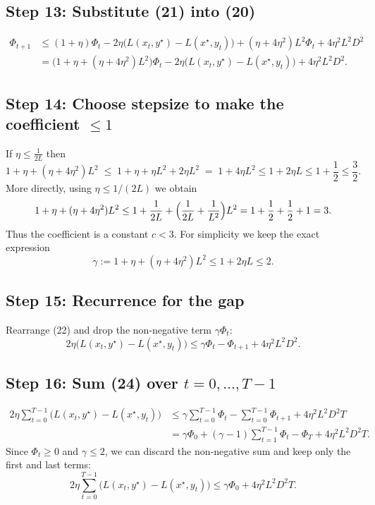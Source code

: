 \documentclass{article}
\begin{document}
\subsection*{Step 13: Substitute (21) into (20)}
\begin{align}
\Phi_{t+1}
&\le (1+\eta)\Phi_{t}
      -2\eta\bigl(L(x_{t},y^{\star})-L(x^{\star},y_{t})\bigr)
      +(\eta+4\eta^{2})L^{2}\Phi_{t}+4\eta^{2}L^{2}D^{2}\nonumber\\
&= \bigl(1+\eta+(\eta+4\eta^{2})L^{2}\bigr)\Phi_{t}
   -2\eta\bigl(L(x_{t},y^{\star})-L(x^{\star},y_{t})\bigr)
   +4\eta^{2}L^{2}D^{2}. \tag{22}
\end{align}

\subsection*{Step 14: Choose stepsize to make the coefficient $\le 1$}
If $\eta\le\frac{1}{2L}$ then
\[
1+\eta+(\eta+4\eta^{2})L^{2}
\;\le\;1+\eta+\eta L^{2}+2\eta L^{2}
\;=\;1+4\eta L^{2}\le 1+2\eta L\le 1+\frac12\le \frac32.
\]
More directly, using $\eta\le 1/(2L)$ we obtain
\[
1+\eta+(\eta+4\eta^{2})L^{2}\le 1+\frac{1}{2L}+\Bigl(\frac{1}{2L}+ \frac{1}{L^{2}}\Bigr)L^{2}
=1+\frac12+ \frac12+1=3.
\]
Thus the coefficient is a constant $c<3$. For simplicity we keep the exact expression
\[
\gamma:=1+\eta+(\eta+4\eta^{2})L^{2}\le 1+2\eta L\le 2. \tag{23}
\]

\subsection*{Step 15: Recurrence for the gap}
Rearrange (22) and drop the non‑negative term $\gamma\Phi_{t}$:
\[
2\eta\bigl(L(x_{t},y^{\star})-L(x^{\star},y_{t})\bigr)
\le \gamma\Phi_{t}-\Phi_{t+1}+4\eta^{2}L^{2}D^{2}. \tag{24}
\]

\subsection*{Step 16: Sum (24) over $t=0,\dots,T-1$}
\begin{align}
2\eta\sum_{t=0}^{T-1}\bigl(L(x_{t},y^{\star})-L(x^{\star},y_{t})\bigr)
&\le \gamma\sum_{t=0}^{T-1}\Phi_{t}-\sum_{t=0}^{T-1}\Phi_{t+1}
   +4\eta^{2}L^{2}D^{2}T \nonumber\\
&= \gamma\Phi_{0}+(\gamma-1)\sum_{t=1}^{T-1}\Phi_{t}
   -\Phi_{T}+4\eta^{2}L^{2}D^{2}T . \tag{25}
\end{align}
Since $\Phi_{t}\ge0$ and $\gamma\le2$, we can discard the non‑negative sum and keep only the first and last terms:
\[
2\eta\sum_{t=0}^{T-1}\bigl(L(x_{t},y^{\star})-L(x^{\star},y_{t})\bigr)
\le \gamma\Phi_{0}+4\eta^{2}L^{2}D^{2}T . \tag{26}
\]
\end{document}
